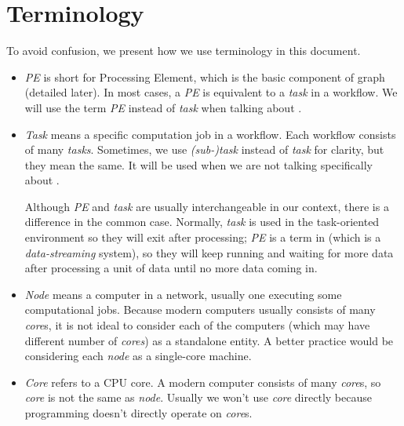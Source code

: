 \chapter{Terminology}
To avoid confusion, we present how we use terminology in this document.

\newenvironment{term_box}{\begin{tcolorbox}[enhanced,width=5in,size=fbox,
    fontupper=\large\bfseries,drop shadow southwest,sharp corners]}{
\end{tcolorbox}}

\begin{itemize}

\item \emph{PE} is short for Processing Element, which is the basic component of \dpy graph (detailed later). In most cases, a \emph{PE} is equivalent to a \emph{task} in a workflow. We will use the term \emph{PE} instead of \emph{task} when talking about \dpy.

\item \emph{Task} means a specific computation job in a workflow. Each workflow consists of many \emph{tasks}. Sometimes, we use \emph{(sub-)task} instead of \emph{task} for clarity, but they mean the same. It will be used when we are not talking specifically about \dpy.

\begin{term_box}
Although \emph{PE} and \emph{task} are usually interchangeable in our context, there is a difference in the common case. Normally, \emph{task} is used in the task-oriented environment so they will exit after processing; \emph{PE} is a term in \dpy (which is a \emph{data-streaming} system), so they will keep running and waiting for more data after processing a unit of data until no more data coming in.
\end{term_box}	
	
\item \emph{Node} means a computer in a network, usually one executing some computational jobs. Because modern computers usually consists of many \emph{core}s, it is not ideal to consider each of the computers (which may have different number of \emph{cores}) as a standalone entity. A better practice would be considering each \emph{node} as a single-core machine.

\item \emph{Core} refers to a CPU core. A modern computer consists of many \emph{core}s, so \emph{core} is not the same as \emph{node}. Usually we won't use \emph{core} directly because programming doesn't directly operate on \emph{core}s.


\end{itemize}
